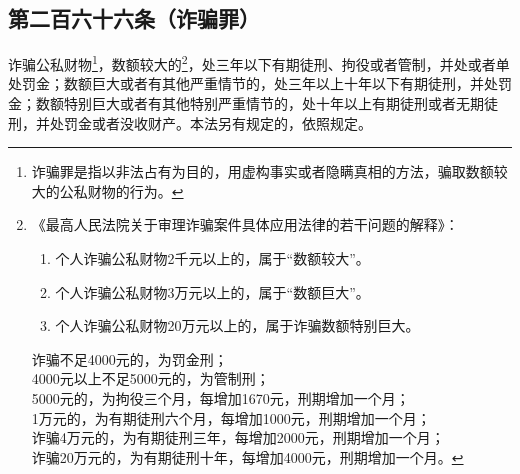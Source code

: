 \documentclass[utf-8,10pt]{ctexart}
\begin{document}
\subsection{第二百六十六条（诈骗罪）}
诈骗公私财物\footnote{
诈骗罪是指以非法占有为目的，用虚构事实或者隐瞒真相的方法，骗取数额较大的公私财物的行为。
}，数额较大的\footnote{
《最高人民法院关于审理诈骗案件具体应用法律的若干问题的解释》：
\begin{enumerate}
\item 个人诈骗公私财物2千元以上的，属于“数额较大”。
\item 个人诈骗公私财物3万元以上的，属于“数额巨大”。
\item 个人诈骗公私财物20万元以上的，属于诈骗数额特别巨大。
\end{enumerate}
诈骗不足4000元的，为罚金刑；\\
4000元以上不足5000元的，为管制刑；\\
5000元的，为拘役三个月，每增加1670元，刑期增加一个月；\\
1万元的，为有期徒刑六个月，每增加1000元，刑期增加一个月；\\
诈骗4万元的，为有期徒刑三年，每增加2000元，刑期增加一个月；\\
诈骗20万元的，为有期徒刑十年，每增加4000元，刑期增加一个月。
}，处三年以下有期徒刑、拘役或者管制，并处或者单处罚金；数额巨大或者有其他严重情节的，处三年以上十年以下有期徒刑，并处罚金；数额特别巨大或者有其他特别严重情节的，处十年以上有期徒刑或者无期徒刑，并处罚金或者没收财产。本法另有规定的，依照规定。
\end{document}
